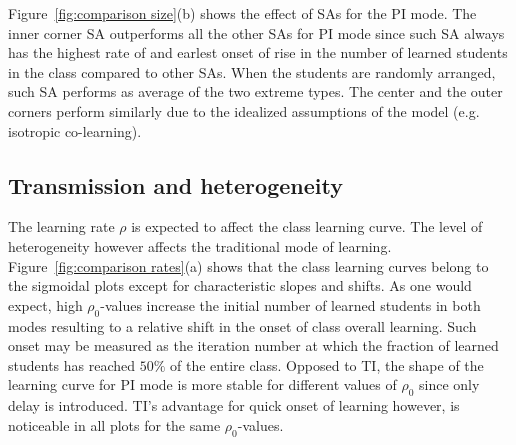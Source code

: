 \documentclass[twocolumn,secnumarabic,amssymb, nobibnotes, aps, prd]{revtex4-2}
\begin{document}
        Figure~\ref{fig:comparison size}(b) shows the effect of SAs for the PI mode.
        The inner corner SA outperforms all the other SAs for PI mode since such SA always has the highest rate of and earlest onset of rise in the number of learned students in the class compared to other SAs.
        When the students are randomly arranged, such SA performs as average of the two extreme types.
        The center and the outer corners perform similarly due to the idealized assumptions of the model (e.g. isotropic co-learning).

    \subsection{Transmission and heterogeneity}

        The learning rate $\rho$ is expected to affect the class learning curve.
        The level of heterogeneity however affects the traditional mode of learning.
        Figure~\ref{fig:comparison rates}(a) shows that the class learning curves belong to the sigmoidal plots except for characteristic slopes and shifts.
        As one would expect, high $\rho_0$-values increase the initial number of learned students in both modes resulting to a relative shift in the onset of class overall learning.
        Such onset may be measured as the iteration number at which the fraction of learned students has reached $50\%$ of the entire class.
        Opposed to TI, the shape of the learning curve for PI mode is more stable for different values of $\rho_0$ since only delay is introduced.
        TI's advantage for quick onset of learning however, is noticeable in all plots for the same $\rho_0$-values.
\end{document}
